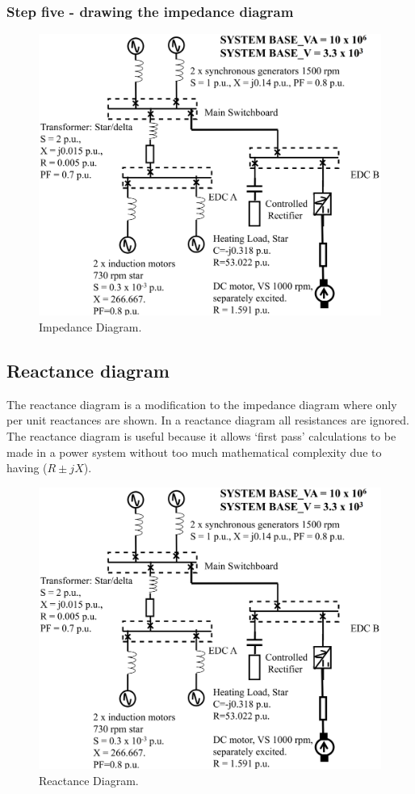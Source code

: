 \documentclass[class=report, crop=false, 12pt,a4paper]{standalone}
\begin{document}
\subsubsection{Step five - drawing the impedance diagram}
\begin{figure}[H]
	\centering
	\includegraphics[width = \textwidth]{../img/figure13.png}
	\caption{Impedance Diagram.}
\end{figure}
\subsection{Reactance diagram}
The reactance diagram is a modification to the impedance diagram where only per unit reactances are shown. In a reactance diagram all resistances are ignored. The reactance diagram is useful because it allows `first pass' calculations to be made in a power system without too much mathematical complexity due to having ($R \pm jX$).
\begin{figure}[H]
	\centering
	\includegraphics[width = \textwidth]{../img/figure13.png}
	\caption{Reactance Diagram.}
\end{figure}
\end{document}
